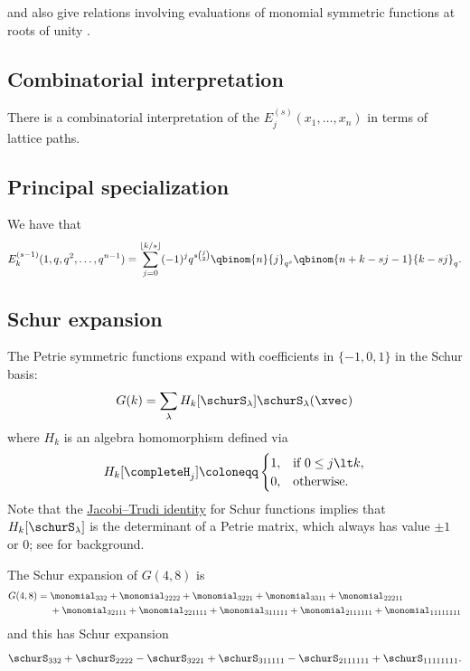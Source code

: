  and  also give relations involving
evaluations of monomial symmetric functions at roots of unity
\cite{AhmiaMerca2020x}.

\subsection[petrieCombinatorial]{Combinatorial interpretation}

There is a combinatorial interpretation of the $E^{(s)}_j(x_1,\dotsc,x_n)$
in terms of lattice paths.

\subsection[petriePrincipal]{Principal specialization}

We have \cite[Cor.~4.1]{AhmiaMerca2020x} that
\[
E^{(s-1)}_k(1,q,q^2,\dotsc,q^{n-1})
=
\sum_{j=0}^{\lfloor k/s \rfloor}
(-1)^j q^{s \binom{j}{2}}
\qbinom{n}{j}_{q^s}
\qbinom{n+k-sj-1}{k-sj}_q.
\]


\subsection[petrieInSchur]{Schur expansion}

The Petrie symmetric functions expand with coefficients in $\{-1,0,1\}$
in the Schur basis:
\[
G(k) = \sum_\lambda H_k[ \schurS_\lambda ] \schurS_\lambda(\xvec)
\]
where $H_k$ is an algebra homomorphism defined via
\[
H_k[\completeH_j] \coloneqq
\begin{cases}
1, & \text{if } 0 \leq j \lt k, \\
0, & \text{otherwise}.
\end{cases}
\]
Note that the \hyperref[schurJacobiTrudi]{Jacobi--Trudi identity}
for Schur functions implies that $H_k[\schurS_\lambda]$ is the determinant of
a Petrie matrix, which always has value $\pm 1$ or $0$; see
\cite{GordonWilkinson1974} for background.

\begin{example*}
The Schur expansion of $G(4,8)$ is
\[
\begin{aligned}
G(4,8)
= {}&
\monomial_{332}+\monomial_{2222}+\monomial_{3221}
+\monomial_{3311}+\monomial_{22211}\\
&+\monomial_{32111}+\monomial_{221111}
+\monomial_{311111}+\monomial_{2111111}
+\monomial_{11111111}
\end{aligned}
\]
and this has Schur expansion
\[
\schurS_{332}+\schurS_{2222}-\schurS_{3221}
+\schurS_{311111}-\schurS_{2111111}+\schurS_{11111111}.
\]
\end{example*}


